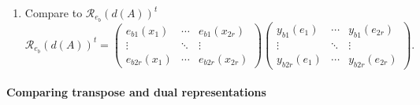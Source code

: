 \documentclass[aps,preprint]{revtex4}
\begin{document}
\begin{enumerate}
i.e. 
\begin{equation}
\mathcal{R}_{e_{b}}\left( d\left( A\right) ^{t}\right) =\left( 
\begin{array}{ccc}
x_{b1}\left( e_{1}\right) & \cdots & x_{b2r}\left( e_{1}\right) \\ 
\vdots & \ddots & \vdots \\ 
x_{b1}\left( e_{2r}\right) & \cdots & x_{b2r}\left( e_{2r}\right)%
\end{array}%
\right) \left( 
\begin{array}{ccc}
e_{b1}\left( y_{1}\right) & \cdots & e_{b2r}\left( y_{1}\right) \\ 
\vdots & \ddots & \vdots \\ 
e_{b1}\left( y_{2r}\right) & \cdots & e_{b2r}\left( y_{2r}\right)%
\end{array}%
\right) .
\end{equation}

\item Compare to $\mathcal{R}_{e_{b}}\left( d\left( A\right) \right) ^{t}$ 
\begin{equation}
\mathcal{R}_{e_{b}}\left( d\left( A\right) \right) ^{t}=\left( 
\begin{array}{ccc}
e_{b1}\left( x_{1}\right) & \cdots & e_{b1}\left( x_{2r}\right) \\ 
\vdots & \ddots & \vdots \\ 
e_{b2r}\left( x_{1}\right) & \cdots & e_{b2r}\left( x_{2r}\right)%
\end{array}%
\right) \left( 
\begin{array}{ccc}
y_{b1}\left( e_{1}\right) & \cdots & y_{b1}\left( e_{2r}\right) \\ 
\vdots & \ddots & \vdots \\ 
y_{b2r}\left( e_{1}\right) & \cdots & y_{b2r}\left( e_{2r}\right)%
\end{array}%
\right) .
\end{equation}
\end{enumerate}

\paragraph{\textbf{Comparing transpose and dual representations}}
\end{document}
